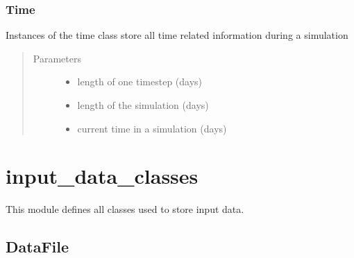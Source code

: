 \documentclass[letterpaper,10pt,english]{sphinxmanual}
\begin{document}
\subsubsection{Time}
\label{\detokenize{index:time}}

\begin{fulllineitems}
\label{\detokenize{index:feast.EmissionSimModules.simulation_classes.Time}}
Instances of the time class store all time related information during a simulation
\begin{quote}\begin{description}
\item[{Parameters}] \leavevmode\begin{itemize}
\item {} 
 \textendash{} length of one timestep (days)

\item {} 
 \textendash{} length of the simulation (days)

\item {} 
 \textendash{} current time in a simulation (days)

\end{itemize}

\end{description}\end{quote}

\end{fulllineitems}



\section{input\_data\_classes}
\label{\detokenize{index:module-feast.input_data_classes}}\label{\detokenize{index:input-data-classes}}
This module defines all classes used to store input data.


\subsection{DataFile}
\label{\detokenize{index:datafile}}
\end{document}
